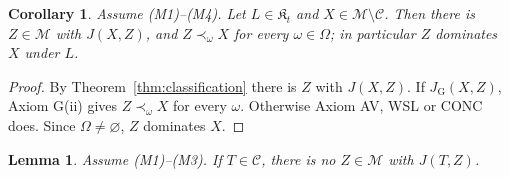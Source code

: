 \documentclass[11pt]{article}
\newtheorem{lemma}[theorem]{Lemma}
\newtheorem{corollary}[theorem]{Corollary}
\theoremstyle{definition}
\newcommand{\M}{\mathcal M}
\newcommand{\C}{\mathcal C}
\newcommand{\K}{\mathfrak K}
\newcommand{\GU}{\mathrm{G}}
\begin{document}
\begin{corollary}\label{cor:direct}
Assume (M1)--(M4). Let $L\in\K_t$ and $X\in\M\setminus\C$. Then there is $Z\in\M$ with $J(X,Z)$, and $Z\prec_\omega X$ for every $\omega\in\Omega$; in particular $Z$ dominates $X$ under $L$.
\end{corollary}
\begin{proof}
By Theorem~\ref{thm:classification} there is $Z$ with $J(X,Z)$. If $J_\GU(X,Z)$, Axiom G(ii) gives $Z\prec_\omega X$ for every $\omega$. Otherwise Axiom AV, WSL or CONC does. Since $\Omega\ne\varnothing$, $Z$ dominates $X$.
\end{proof}

\begin{lemma}\label{lem:noJ}
Assume (M1)--(M3). If $T\in\C$, there is no $Z\in\M$ with $J(T,Z)$.
\end{lemma}
\end{document}
